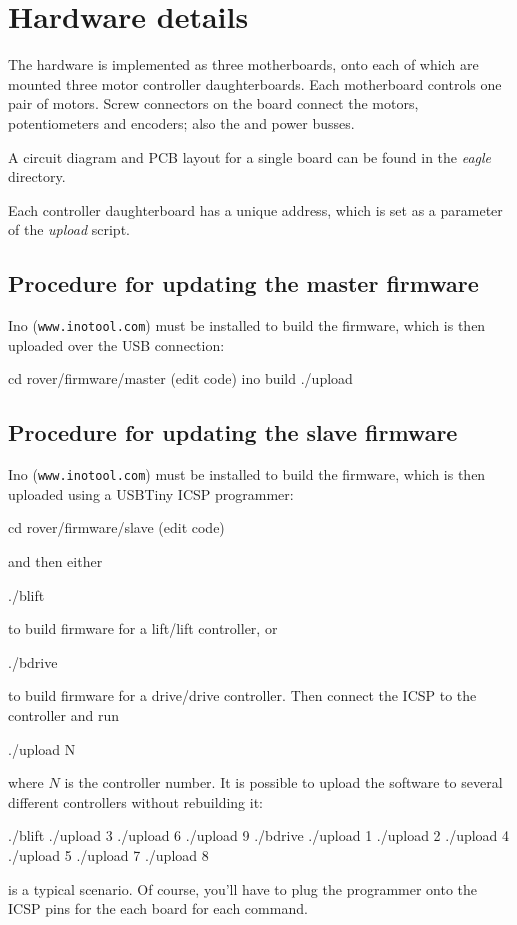 \section{Hardware details}
The hardware is implemented as three motherboards, onto each of which are mounted
three motor controller daughterboards. Each motherboard controls one
pair of motors. Screw connectors on the board connect the motors, potentiometers
and encoders; also the \isqc{} and power busses.

A circuit diagram and PCB layout for a single board can be found in the \emph{eagle} directory.

Each controller daughterboard has a unique \isqc{} address, which is set
as a parameter of the \emph{upload} script. 

\subsection{Procedure for updating the master firmware}
Ino (\verb+www.inotool.com+) must be installed to build the firmware, which
is then uploaded over the USB connection:
\begin{v}
cd rover/firmware/master
(edit code)
ino build
./upload
\end{v}
\subsection{Procedure for updating the slave firmware}
Ino (\verb+www.inotool.com+) must be installed to build the firmware, which
is then uploaded using a USBTiny ICSP programmer:
\begin{v}
cd rover/firmware/slave
(edit code)
\end{v}
and then either
\begin{v}
./blift
\end{v}
to build firmware for a lift/lift controller, or
\begin{v}
./bdrive
\end{v}
to build firmware for a drive/drive controller.
Then connect the ICSP to the controller and run
\begin{v}
./upload N
\end{v}
where $N$ is the controller number. It is possible to upload the software
to several different controllers without rebuilding it:
\begin{v}
./blift
./upload 3
./upload 6
./upload 9
./bdrive
./upload 1
./upload 2
./upload 4
./upload 5
./upload 7
./upload 8
\end{v}
is a typical scenario. Of course, you'll have to plug the programmer
onto the ICSP pins for the each board for each command.


